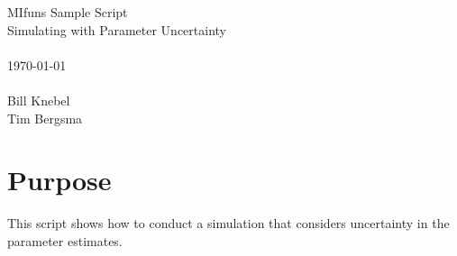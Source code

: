 
\usepackage{Sweave}

 

\vspace*{2cm}
\begin{center}
{\Large MIfuns Sample Script}\\
\vspace{1.5cm}
{\Large Simulating with Parameter Uncertainty}\\
~\\
\today\\
~\\
Bill Knebel\\
Tim Bergsma\\
\end{center}
\newpage

\section{Purpose}
This script shows how to conduct a simulation that
considers uncertainty in the parameter estimates.
